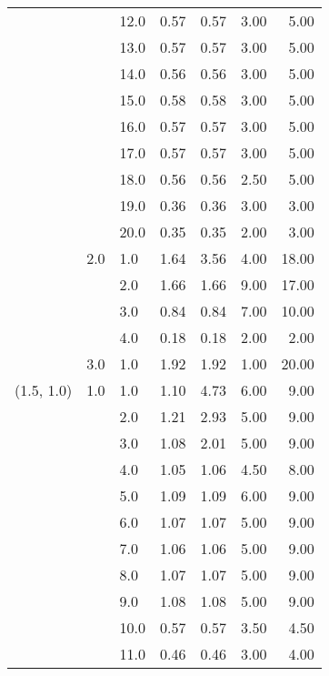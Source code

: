 \begin{tabular}{lllrrrr}
           &     & 12.0 &       0.57 &      0.57 & 3.00 &   5.00 \\
           &     & 13.0 &       0.57 &      0.57 & 3.00 &   5.00 \\
           &     & 14.0 &       0.56 &      0.56 & 3.00 &   5.00 \\
           &     & 15.0 &       0.58 &      0.58 & 3.00 &   5.00 \\
           &     & 16.0 &       0.57 &      0.57 & 3.00 &   5.00 \\
           &     & 17.0 &       0.57 &      0.57 & 3.00 &   5.00 \\
           &     & 18.0 &       0.56 &      0.56 & 2.50 &   5.00 \\
           &     & 19.0 &       0.36 &      0.36 & 3.00 &   3.00 \\
           &     & 20.0 &       0.35 &      0.35 & 2.00 &   3.00 \\
           & 2.0 & 1.0  &       1.64 &      3.56 & 4.00 &  18.00 \\
           &     & 2.0  &       1.66 &      1.66 & 9.00 &  17.00 \\
           &     & 3.0  &       0.84 &      0.84 & 7.00 &  10.00 \\
           &     & 4.0  &       0.18 &      0.18 & 2.00 &   2.00 \\
           & 3.0 & 1.0  &       1.92 &      1.92 & 1.00 &  20.00 \\
(1.5, 1.0) & 1.0 & 1.0  &       1.10 &      4.73 & 6.00 &   9.00 \\
           &     & 2.0  &       1.21 &      2.93 & 5.00 &   9.00 \\
           &     & 3.0  &       1.08 &      2.01 & 5.00 &   9.00 \\
           &     & 4.0  &       1.05 &      1.06 & 4.50 &   8.00 \\
           &     & 5.0  &       1.09 &      1.09 & 6.00 &   9.00 \\
           &     & 6.0  &       1.07 &      1.07 & 5.00 &   9.00 \\
           &     & 7.0  &       1.06 &      1.06 & 5.00 &   9.00 \\
           &     & 8.0  &       1.07 &      1.07 & 5.00 &   9.00 \\
           &     & 9.0  &       1.08 &      1.08 & 5.00 &   9.00 \\
           &     & 10.0 &       0.57 &      0.57 & 3.50 &   4.50 \\
           &     & 11.0 &       0.46 &      0.46 & 3.00 &   4.00 \\

\end{tabular}
